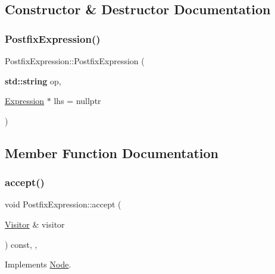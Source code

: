 \subsection{Constructor \& Destructor Documentation}
\mbox{\label{struct_postfix_expression_a51cc535ac4af99bef2f292fb1ead6ad7}} 
\subsubsection{\texorpdfstring{Postfix\+Expression()}{PostfixExpression()}}
{\footnotesize\ttfamily Postfix\+Expression\+::\+Postfix\+Expression (\begin{DoxyParamCaption}\item[{\textbf{ std\+::string}}]{op,  }\item[{\hyperlink{struct_expression}{Expression} $\ast$}]{lhs = {\ttfamily nullptr} }\end{DoxyParamCaption})\hspace{0.3cm}{\ttfamily [inline]}}



\subsection{Member Function Documentation}
\mbox{\label{struct_postfix_expression_a2d814c990b7d1fb728f030a2673fe729}} 
\subsubsection{\texorpdfstring{accept()}{accept()}}
{\footnotesize\ttfamily void Postfix\+Expression\+::accept (\begin{DoxyParamCaption}\item[{\hyperlink{struct_visitor}{Visitor} \&}]{visitor }\end{DoxyParamCaption}) const\hspace{0.3cm}{\ttfamily [inline]}, {\ttfamily [override]}, {\ttfamily [virtual]}}



Implements \hyperlink{struct_node_a10bd7af968140bbf5fa461298a969c71}{Node}.



